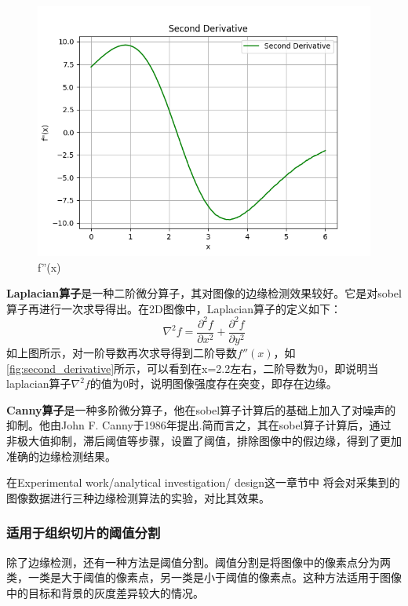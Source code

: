 \begin{figure}[htbp]
\begin{minipage}[b]{0.32\textwidth}
        \centering
        \includegraphics[width=\textwidth]{./fig/second_derivative.png}
        \caption{f''(x)}
        \label{fig:second_derivative}
    \end{minipage}
\end{figure}

\textbf{Laplacian算子}是一种二阶微分算子，其对图像的边缘检测效果较好。它是对sobel算子再进行一次求导得出。在2D图像中，Laplacian算子的定义如下：
\begin{equation}
    \nabla^2 f = \frac{\partial^2 f}{\partial x^2} + \frac{\partial^2 f}{\partial y^2}
\end{equation}
如上图所示，对一阶导数再次求导得到二阶导数$f''(x)$，如\autoref{fig:second_derivative}所示，可以看到在x=2.2左右，二阶导数为0，即说明当laplacian算子$\nabla^2 f$的值为0时，说明图像强度存在突变，即存在边缘。

\textbf{Canny算子}是一种多阶微分算子，他在sobel算子计算后的基础上加入了对噪声的抑制。他由John F. Canny于1986年提出\cite{3.2}.简而言之，其在sobel算子计算后，通过非极大值抑制，滞后阈值等步骤，设置了阈值，排除图像中的假边缘，得到了更加准确的边缘检测结果。

在Experimental work/analytical investigation/ design这一章节中 将会对采集到的图像数据进行三种边缘检测算法的实验，对比其效果。

\subsubsection{适用于组织切片的阈值分割}

除了边缘检测，还有一种方法是阈值分割。阈值分割是将图像中的像素点分为两类，一类是大于阈值的像素点，另一类是小于阈值的像素点。这种方法适用于图像中的目标和背景的灰度差异较大的情况。

